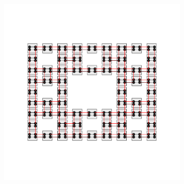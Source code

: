 \begin{figure}[h!]
\begin{minipage}[h!]{1.0\textwidth}
\begin{subfigure}[b!]{0.2 \textwidth}
             \label{}
         \end{subfigure}\hspace*{-0.5em}
         \begin{subfigure}[b!]{0.2 \textwidth}
             \caption*{}
             \includegraphics[width=\textwidth]{Imagenes/Models/Model_pump/fractal_pump_model_y_16.pdf}
             \label{}
         \end{subfigure}\hspace*{-0.5em}
     \end{minipage}\vspace*{-1em}
    
     
     
    \caption{}
    \label{fig:Model_pump}
\end{figure}